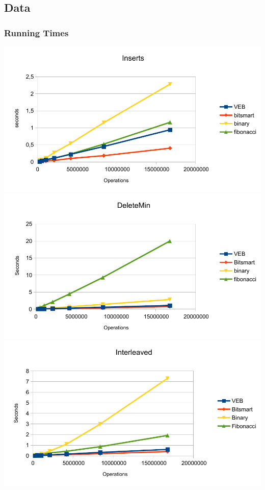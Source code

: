 \subsection{Data}

\subsubsection{Running Times}
\includegraphics[width=\textwidth]{graphs/Inserts.pdf}
\includegraphics[width=\textwidth]{graphs/DeleteMin.pdf}
\includegraphics[width=\textwidth]{graphs/Interleaved.pdf}

